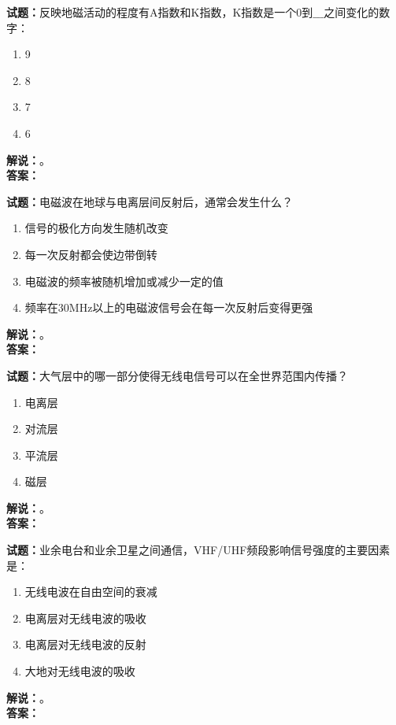 \documentclass{ctexbook}
\begin{document}
\bigskip

\noindent\textbf{试题：}反映地磁活动的程度有A指数和K指数，K指数是一个0到$\_\_\_$之间变化的数字：
\begin{enumerate}[leftmargin=3em]
  \item 9
  \item 8
  \item 7
  \item 6
\end{enumerate}
\noindent\textbf{解说：}\textbf{}。\\\noindent\textbf{答案：}

\bigskip

\noindent\textbf{试题：}电磁波在地球与电离层间反射后，通常会发生什么？
\begin{enumerate}[leftmargin=3em]
  \item 信号的极化方向发生随机改变
  \item 每一次反射都会使边带倒转
  \item 电磁波的频率被随机增加或减少一定的值
  \item 频率在30\unit{\MHz}以上的电磁波信号会在每一次反射后变得更强
\end{enumerate}
\noindent\textbf{解说：}\textbf{}。\\\noindent\textbf{答案：}

\bigskip

\noindent\textbf{试题：}大气层中的哪一部分使得无线电信号可以在全世界范围内传播？
\begin{enumerate}[leftmargin=3em]
  \item 电离层
  \item 对流层
  \item 平流层
  \item 磁层
\end{enumerate}
\noindent\textbf{解说：}\textbf{}。\\\noindent\textbf{答案：}

\bigskip

\noindent\textbf{试题：}业余电台和业余卫星之间通信，VHF/UHF频段影响信号强度的主要因素是：
\begin{enumerate}[leftmargin=3em]
  \item 无线电波在自由空间的衰减
  \item 电离层对无线电波的吸收
  \item 电离层对无线电波的反射
  \item 大地对无线电波的吸收
\end{enumerate}
\noindent\textbf{解说：}\textbf{}。\\\noindent\textbf{答案：}
\end{document}
